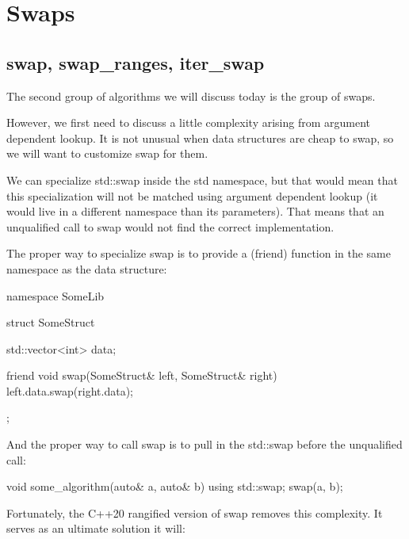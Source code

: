 \section{Swaps}

\subsection{swap, swap\_ranges, iter\_swap}

The second group of algorithms we will discuss today is the group of swaps.


However, we first need to discuss a little complexity arising from argument dependent lookup. It is not unusual when data structures are cheap to swap, so we will want to customize swap for them.

We can specialize std::swap inside the std namespace, but that would mean that this specialization will not be matched using argument dependent lookup (it would live in a different namespace than its parameters). That means that an unqualified call to swap would not find the correct implementation.

The proper way to specialize swap is to provide a (friend) function in the same namespace as the data structure:

\begin{box-note}
\begin{cppcode}
namespace SomeLib {

struct SomeStruct {
    std::vector<int> data;

    friend void swap(SomeStruct& left, SomeStruct& right) {
        left.data.swap(right.data);
    }
};

}
\end{cppcode}
\end{box-note}

And the proper way to call swap is to pull in the std::swap before the unqualified call:

\begin{box-note}
\begin{cppcode}
void some_algorithm(auto& a, auto& b) {
    using std::swap;
    swap(a, b);
}
\end{cppcode}
\end{box-note}

Fortunately, the C++20 rangified version of swap removes this complexity. It serves as an ultimate solution it will:

